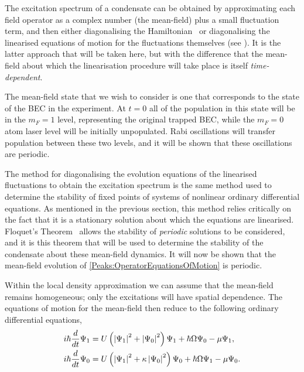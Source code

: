 The excitation spectrum of a condensate can be obtained by approximating each field operator as a complex number (the mean-field) plus a small fluctuation term, and then either diagonalising the Hamiltonian~\cite{Bogoliubov:1947,FetterWalecka} or diagonalising the linearised equations of motion for the fluctuations themselves (see ). It is the latter approach that will be taken here, but with the difference that the mean-field about which the linearisation procedure will take place is itself \emph{time-dependent}.

The mean-field state that we wish to consider is one that corresponds to the state of the BEC in the experiment. At $t=0$ all of the population in this state will be in the $m_F=1$ level, representing the original trapped BEC, while the $m_F=0$ atom laser level will be initially unpopulated. Rabi oscillations will transfer population between these two levels, and it will be shown that these oscillations are periodic.

The method for diagonalising the evolution equations of the linearised fluctuations to obtain the excitation spectrum is the same method used to determine the stability of fixed points of systems of nonlinear ordinary differential equations. As mentioned in the previous section, this method relies critically on the fact that it is a stationary solution about which the equations are linearised. Floquet's Theorem~\citep{AppliedNonlinearDynamics} allows the stability of \emph{periodic} solutions to be considered, and it is this theorem that will be used to determine the stability of the condensate about these mean-field dynamics. It will now be shown that the mean-field evolution of \eqref{Peaks:OperatorEquationsOfMotion} is periodic.

Within the local density approximation we can assume that the mean-field remains homogeneous; only the excitations will have spatial dependence. The equations of motion for the mean-field then reduce to the following ordinary differential equations,
\begin{subequations}
    \label{Peaks:MeanFieldEquationsOfMotion}
    \begin{align}
    i \hbar \frac{d }{dt}\Psi_1 &= U\left(\abs{\Psi_1}^2 + \abs{\Psi_0}^2\right)\Psi_1 + \hbar \Omega \Psi_0 - \mu \Psi_1,\\
    i \hbar \frac{d }{dt}\Psi_0 &= U\left(\abs{\Psi_1}^2 + \kappa \abs{\Psi_0}^2\right)\Psi_0 + \hbar \Omega \Psi_1 - \mu \Psi_0.
    \end{align}
\end{subequations}


